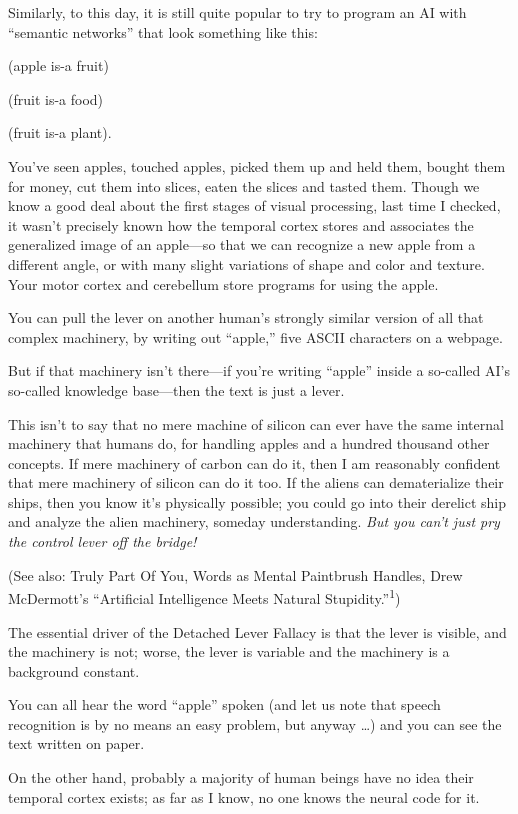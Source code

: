 {
 Similarly, to this day, it is still quite popular to try to
program an AI with ``semantic
networks'' that look something like this:}

{
 (apple is-a fruit)}

{
 (fruit is-a food)}

{
 (fruit is-a plant).}

{
 You've seen apples, touched apples, picked them up
and held them, bought them for money, cut them into slices, eaten the
slices and tasted them. Though we know a good deal about the first
stages of visual processing, last time I checked, it
wasn't precisely known how the temporal cortex stores
and associates the generalized image of an apple---so that we can
recognize a new apple from a different angle, or with many slight
variations of shape and color and texture. Your motor cortex and
cerebellum store programs for using the apple.}

{
 You can pull the lever on another human's strongly
similar version of all that complex machinery, by writing out
``apple,'' five ASCII characters on
a webpage.}

{
 But if that machinery isn't there---if
you're writing
``apple'' inside a so-called
AI's so-called knowledge base---then the text is just a
lever.}

{
 This isn't to say that no mere machine of silicon
can ever have the same internal machinery that humans do, for handling
apples and a hundred thousand other concepts. If mere machinery of
carbon can do it, then I am reasonably confident that mere machinery of
silicon can do it too. If the aliens can dematerialize their ships,
then you know it's physically possible; you could go
into their derelict ship and analyze the alien machinery, someday
understanding. \textit{But you can't just pry the
control lever off the bridge!}}

{
 (See also: Truly Part Of You, Words as Mental Paintbrush Handles,
Drew McDermott's ``Artificial
Intelligence Meets Natural
Stupidity.''\textsuperscript{1})}

{
 The essential driver of the Detached Lever Fallacy is that the
lever is visible, and the machinery is not; worse, the lever is
variable and the machinery is a background constant.}

{
 You can all hear the word
``apple'' spoken (and let us note
that speech recognition is by no means an easy problem, but anyway
\ldots) and you can see the text written on paper.}

{
 On the other hand, probably a majority of human beings have no
idea their temporal cortex exists; as far as I know, no one knows the
neural code for it.}

